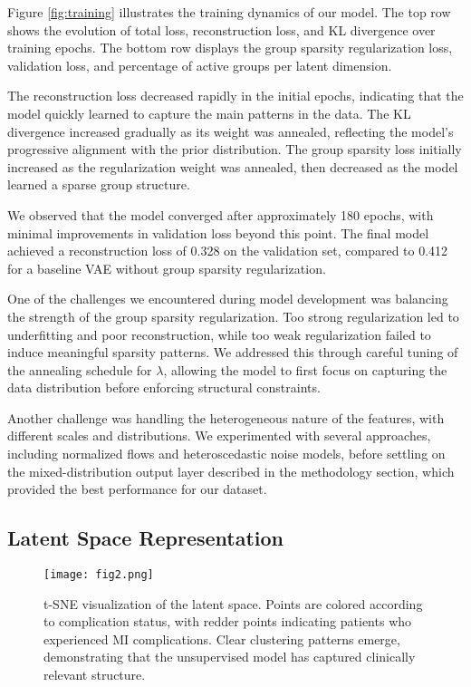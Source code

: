 \documentclass[oupdraft]{bio}
\begin{document}
Figure \ref{fig:training} illustrates the training dynamics of our model. The top row shows the evolution of total loss, reconstruction loss, and KL divergence over training epochs. The bottom row displays the group sparsity regularization loss, validation loss, and percentage of active groups per latent dimension.

The reconstruction loss decreased rapidly in the initial epochs, indicating that the model quickly learned to capture the main patterns in the data. The KL divergence increased gradually as its weight was annealed, reflecting the model's progressive alignment with the prior distribution. The group sparsity loss initially increased as the regularization weight was annealed, then decreased as the model learned a sparse group structure.

We observed that the model converged after approximately 180 epochs, with minimal improvements in validation loss beyond this point. The final model achieved a reconstruction loss of 0.328 on the validation set, compared to 0.412 for a baseline VAE without group sparsity regularization.

One of the challenges we encountered during model development was balancing the strength of the group sparsity regularization. Too strong regularization led to underfitting and poor reconstruction, while too weak regularization failed to induce meaningful sparsity patterns. We addressed this through careful tuning of the annealing schedule for $\lambda$, allowing the model to first focus on capturing the data distribution before enforcing structural constraints.

Another challenge was handling the heterogeneous nature of the features, with different scales and distributions. We experimented with several approaches, including normalized flows and heteroscedastic noise models, before settling on the mixed-distribution output layer described in the methodology section, which provided the best performance for our dataset.

\subsection{Latent Space Representation}

\begin{figure}[t]
    \centering
    \texttt{[image: fig2.png]}
    \caption{t-SNE visualization of the latent space. Points are colored according to complication status, with redder points indicating patients who experienced MI complications. Clear clustering patterns emerge, demonstrating that the unsupervised model has captured clinically relevant structure.}
    \label{fig:tsne}
\end{figure}
\end{document}
